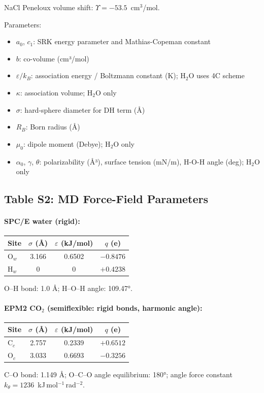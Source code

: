 \documentclass[11pt]{article}
\begin{document}
\noindent NaCl Peneloux volume shift: $\Upsilon = -53.5$~cm$^3$/mol.

Parameters:
\begin{itemize}
  \item $a_0$, $c_1$: SRK energy parameter and Mathias-Copeman constant
  \item $b$: co-volume (cm³/mol)
  \item $\varepsilon/k_B$: association energy / Boltzmann constant (K); H$_2$O uses 4C scheme
  \item $\kappa$: association volume; H$_2$O only
  \item $\sigma$: hard-sphere diameter for DH term (Å)
  \item $R_B$: Born radius (Å)
  \item $\mu_0$: dipole moment (Debye); H$_2$O only
  \item $\alpha_0$, $\gamma$, $\theta$: polarizability (Å³), surface tension (mN/m), H-O-H angle (deg); H$_2$O only
\end{itemize}

\subsection*{Table S2: MD Force-Field Parameters}

\paragraph{SPC/E water (rigid):}
\begin{center}
\begin{tabular}{lccc}
\hline
Site & $\sigma$ (Å) & $\varepsilon$ (kJ/mol) & $q$ (e) \\
\hline
O$_w$ & 3.166 & 0.6502 & $-0.8476$ \\
H$_w$ & 0 & 0 & $+0.4238$ \\
\hline
\end{tabular}
\end{center}
O--H bond: 1.0 Å; H--O--H angle: 109.47°.

\paragraph{EPM2 CO$_2$ (semiflexible: rigid bonds, harmonic angle):}
\begin{center}
\begin{tabular}{lccc}
\hline
Site & $\sigma$ (Å) & $\varepsilon$ (kJ/mol) & $q$ (e) \\
\hline
C$_c$ & 2.757 & 0.2339 & $+0.6512$ \\
O$_c$ & 3.033 & 0.6693 & $-0.3256$ \\
\hline
\end{tabular}
\end{center}
C--O bond: 1.149 Å; O--C--O angle equilibrium: 180°; angle force constant $k_\theta = 1236$~kJ\,mol$^{-1}$\,rad$^{-2}$.
\end{document}
